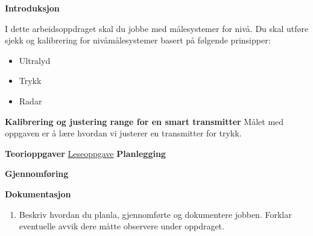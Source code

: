 

\noindent

\vskip 5pt


\textbf{Introduksjon}

I dette arbeidsoppdraget skal du jobbe med målesystemer for nivå. Du skal utføre sjekk og kalibrering for nivåmålesystemer basert på følgende prinsipper:
\begin{itemize}[noitemsep]
	\item Ultralyd
	\item Trykk
	\item Radar
\end{itemize}

\textbf{Kalibrering og justering range for en smart transmitter}
Målet med oppgaven er å lære hvordan vi justerer en transmitter for trykk.



\textbf{Teorioppgaver}
\href {https://autofaget.no/level/node2.html} {Leseoppgave}
\textbf{Planlegging}


\textbf{Gjennomføring}

\textbf{Dokumentasjon}

\begin{enumerate}
	\item Beskriv hvordan du planla, gjennomførte og dokumentere jobben. Forklar eventuelle avvik dere måtte observere under oppdraget. 
\end{enumerate}










\vfil 


\vfil \eject


















